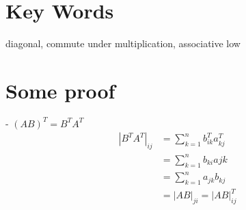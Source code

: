 \documentclass[a4paper,10pt]{article}
\begin{document}
\section{Key Words}	
	diagonal, commute under multiplication, associative low
\section{Some proof}
- $(AB)^T = B^TA^T$ \\
\begin{equation}
\begin{split}
|B^TA^T|_{ij} 
& = \sum_{k=1}^n b^T_{ik}a^T_{kj} \\
& = \sum_{k=1}^n b_{ki}a{jk} \\
& = \sum_{k=1}^n a_{jk}b_{kj} \\
& = |AB|_{ji} = |AB|^T_{ij}
\end{split}
\end{equation}
\end{document}

